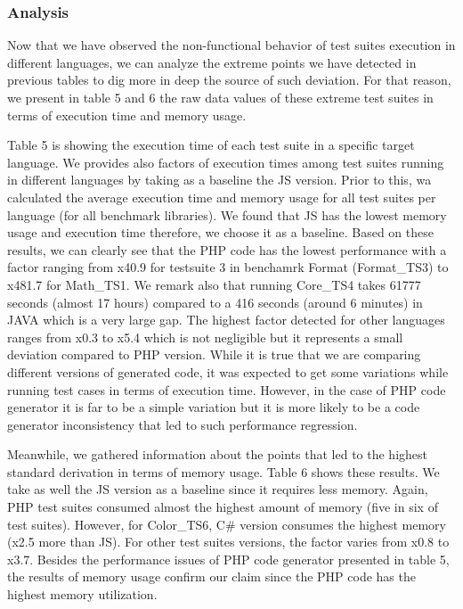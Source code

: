 \subsubsection{Analysis}
Now that we have observed the non-functional behavior of test suites execution in different languages, we can analyze the extreme points we have detected in previous tables to dig more in deep the source of such deviation.
For that reason, we present in table 5 and 6 the raw data values of these extreme test suites in terms of execution time and memory usage. 

Table 5 is showing the execution time of each test suite in a specific target language. We provides also factors of execution times among test suites running in different languages by taking as a baseline the JS version. 
Prior to this, wa calculated the average execution time and memory usage for all test suites per language (for all benchmark libraries). We found that JS has the lowest memory usage and execution time therefore, we choose it as a baseline. Based on these results, we can clearly see that the PHP code has the lowest performance with a factor ranging from x40.9 for testsuite 3 in benchamrk Format (Format\_TS3) to x481.7 for Math\_TS1. We remark also that running Core\_TS4 takes 61777 seconds (almost 17 hours) compared to a 416 seconds (around 6 minutes) in JAVA which is a very large gap. The highest factor detected for other languages ranges from x0.3 to x5.4 which is not negligible but it represents a small deviation compared to PHP version. While it is true that we are comparing different versions of generated code, it was expected to get some variations while running test cases in terms of execution time. However, in the case of PHP code generator it is far to be a simple variation but it is more likely to be a code generator inconsistency that led to such performance regression. 

Meanwhile, we gathered information about the points that led to the highest standard derivation in terms of memory usage. Table 6 shows these results. We take as well the JS version as a baseline since it requires less memory. Again, PHP test suites consumed almost the highest amount of memory (five in six of test suites). However, for Color\_TS6, C\# version consumes the highest memory (x2.5 more than JS). For other test suites versions, the factor varies from x0.8 to x3.7. Besides the performance issues of PHP code generator presented in table 5, the results of memory usage confirm our claim since the PHP code has the highest memory utilization.
 


